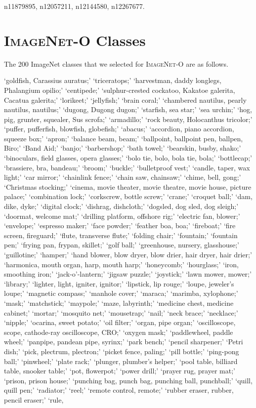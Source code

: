 \documentclass[10pt,twocolumn,letterpaper]{article}
\begin{document}
\quad n11879895, \quad n12057211, \quad n12144580, \quad n12267677.

\section{\textsc{ImageNet-O} Classes}\label{app:classeso}

The 200 ImageNet classes that we selected for \textsc{ImageNet-O} are as follows.

\noindent`goldfish, Carassius auratus;' `triceratops;' `harvestman, daddy longlegs, Phalangium opilio;' `centipede;' `sulphur-crested cockatoo, Kakatoe galerita, Cacatua galerita;' `lorikeet;' `jellyfish;' `brain coral;' `chambered nautilus, pearly nautilus, nautilus;' `dugong, Dugong dugon;' `starfish, sea star;' `sea urchin;' `hog, pig, grunter, squealer, Sus scrofa;' `armadillo;' `rock beauty, Holocanthus tricolor;' `puffer, pufferfish, blowfish, globefish;' `abacus;' `accordion, piano accordion, squeeze box;' `apron;' `balance beam, beam;' `ballpoint, ballpoint pen, ballpen, Biro;' `Band Aid;' `banjo;' `barbershop;' `bath towel;' `bearskin, busby, shako;' `binoculars, field glasses, opera glasses;' `bolo tie, bolo, bola tie, bola;' `bottlecap;' `brassiere, bra, bandeau;' `broom;' `buckle;' `bulletproof vest;' `candle, taper, wax light;' `car mirror;' `chainlink fence;' `chain saw, chainsaw;' `chime, bell, gong;' `Christmas stocking;' `cinema, movie theater, movie theatre, movie house, picture palace;' `combination lock;' `corkscrew, bottle screw;' `crane;' `croquet ball;' `dam, dike, dyke;' `digital clock;' `dishrag, dishcloth;' `dogsled, dog sled, dog sleigh;' `doormat, welcome mat;' `drilling platform, offshore rig;' `electric fan, blower;' `envelope;' `espresso maker;' `face powder;' `feather boa, boa;' `fireboat;' `fire screen, fireguard;' `flute, transverse flute;' `folding chair;' `fountain;' `fountain pen;' `frying pan, frypan, skillet;' `golf ball;' `greenhouse, nursery, glasshouse;' `guillotine;' `hamper;' `hand blower, blow dryer, blow drier, hair dryer, hair drier;' `harmonica, mouth organ, harp, mouth harp;' `honeycomb;' `hourglass;' `iron, smoothing iron;' `jack-o'-lantern;' `jigsaw puzzle;' `joystick;' `lawn mower, mower;' `library;' `lighter, light, igniter, ignitor;' `lipstick, lip rouge;' `loupe, jeweler's loupe;' `magnetic compass;' `manhole cover;' `maraca;' `marimba, xylophone;' `mask;' `matchstick;' `maypole;' `maze, labyrinth;' `medicine chest, medicine cabinet;' `mortar;' `mosquito net;' `mousetrap;' `nail;' `neck brace;' `necklace;' `nipple;' `ocarina, sweet potato;' `oil filter;' `organ, pipe organ;' `oscilloscope, scope, cathode-ray oscilloscope, CRO;' `oxygen mask;' `paddlewheel, paddle wheel;' `panpipe, pandean pipe, syrinx;' `park bench;' `pencil sharpener;' `Petri dish;' `pick, plectrum, plectron;' `picket fence, paling;' `pill bottle;' `ping-pong ball;' `pinwheel;' `plate rack;' `plunger, plumber's helper;' `pool table, billiard table, snooker table;' `pot, flowerpot;' `power drill;' `prayer rug, prayer mat;' `prison, prison house;' `punching bag, punch bag, punching ball, punchball;' `quill, quill pen;' `radiator;' `reel;' `remote control, remote;' `rubber eraser, rubber, pencil eraser;' `rule, 
\end{document}
